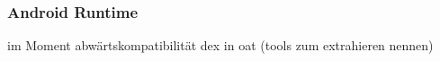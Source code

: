 \subsubsection{Android Runtime} \label{subsubsection:android-evolution-art}
im Moment abwärtskompatibilität dex in oat (tools zum extrahieren nennen)
